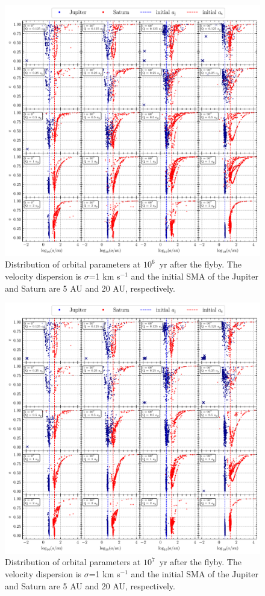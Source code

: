 \documentclass[twocolumn]{aastex63}
\begin{document}
\begin{figure}
    \includegraphics[width=\textwidth]{figs/ae-1e6.pdf}
    \caption{Distribution of orbital parameters at $10^6$~yr after the flyby. The velocity dispersion is $\sigma$=1 km s$^{-1}$ and the initial SMA of the Jupiter and Saturn are 5 AU and 20 AU, respectively.}
    \label{fig:a-et6}
\end{figure}
\begin{figure}
    \includegraphics[width=\textwidth]{figs/ae-1e7.pdf}
    \caption{Distribution of orbital parameters at $10^7$~yr after the flyby. The velocity dispersion is $\sigma$=1 km s$^{-1}$ and the initial SMA of the Jupiter and Saturn are 5 AU and 20 AU, respectively.}
    \label{fig:a-et7}
\end{figure}
\end{document}
